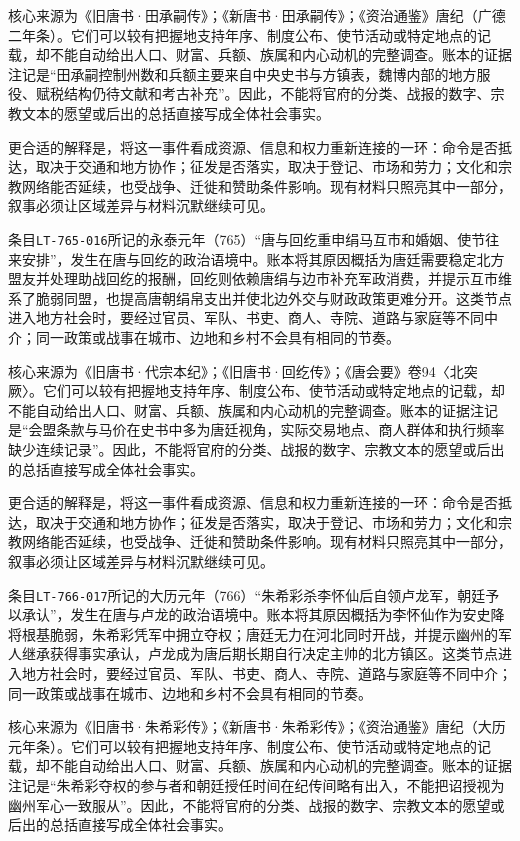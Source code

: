 核心来源为《旧唐书·田承嗣传》；《新唐书·田承嗣传》；《资治通鉴》唐纪（广德二年条）。它们可以较有把握地支持年序、制度公布、使节活动或特定地点的记载，却不能自动给出人口、财富、兵额、族属和内心动机的完整调查。账本的证据注记是“田承嗣控制州数和兵额主要来自中央史书与方镇表，魏博内部的地方服役、赋税结构仍待文献和考古补充”。因此，不能将官府的分类、战报的数字、宗教文本的愿望或后出的总括直接写成全体社会事实。

更合适的解释是，将这一事件看成资源、信息和权力重新连接的一环：命令是否抵达，取决于交通和地方协作；征发是否落实，取决于登记、市场和劳力；文化和宗教网络能否延续，也受战争、迁徙和赞助条件影响。现有材料只照亮其中一部分，叙事必须让区域差异与材料沉默继续可见。

条目\texttt{LT-765-016}所记的永泰元年（765）“唐与回纥重申绢马互市和婚姻、使节往来安排”，发生在唐与回纥的政治语境中。账本将其原因概括为唐廷需要稳定北方盟友并处理助战回纥的报酬，回纥则依赖唐绢与边市补充军政消费，并提示互市维系了脆弱同盟，也提高唐朝绢帛支出并使北边外交与财政政策更难分开。这类节点进入地方社会时，要经过官员、军队、书吏、商人、寺院、道路与家庭等不同中介；同一政策或战事在城市、边地和乡村不会具有相同的节奏。

核心来源为《旧唐书·代宗本纪》；《旧唐书·回纥传》；《唐会要》卷94〈北突厥〉。它们可以较有把握地支持年序、制度公布、使节活动或特定地点的记载，却不能自动给出人口、财富、兵额、族属和内心动机的完整调查。账本的证据注记是“会盟条款与马价在史书中多为唐廷视角，实际交易地点、商人群体和执行频率缺少连续记录”。因此，不能将官府的分类、战报的数字、宗教文本的愿望或后出的总括直接写成全体社会事实。

更合适的解释是，将这一事件看成资源、信息和权力重新连接的一环：命令是否抵达，取决于交通和地方协作；征发是否落实，取决于登记、市场和劳力；文化和宗教网络能否延续，也受战争、迁徙和赞助条件影响。现有材料只照亮其中一部分，叙事必须让区域差异与材料沉默继续可见。

条目\texttt{LT-766-017}所记的大历元年（766）“朱希彩杀李怀仙后自领卢龙军，朝廷予以承认”，发生在唐与卢龙的政治语境中。账本将其原因概括为李怀仙作为安史降将根基脆弱，朱希彩凭军中拥立夺权；唐廷无力在河北同时开战，并提示幽州的军人继承获得事实承认，卢龙成为唐后期长期自行决定主帅的北方镇区。这类节点进入地方社会时，要经过官员、军队、书吏、商人、寺院、道路与家庭等不同中介；同一政策或战事在城市、边地和乡村不会具有相同的节奏。

核心来源为《旧唐书·朱希彩传》；《新唐书·朱希彩传》；《资治通鉴》唐纪（大历元年条）。它们可以较有把握地支持年序、制度公布、使节活动或特定地点的记载，却不能自动给出人口、财富、兵额、族属和内心动机的完整调查。账本的证据注记是“朱希彩夺权的参与者和朝廷授任时间在纪传间略有出入，不能把诏授视为幽州军心一致服从”。因此，不能将官府的分类、战报的数字、宗教文本的愿望或后出的总括直接写成全体社会事实。

